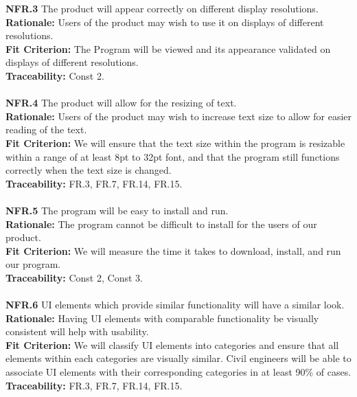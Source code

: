 \documentclass[12pt]{article}
\begin{document}
  \noindent\textbf{NFR.3} The product will appear correctly on different display resolutions.\\
  \textbf{Rationale:} Users of the product may wish to use it on displays of different resolutions.\\
  \textbf{Fit Criterion:} The Program will be viewed and its appearance validated on displays of different resolutions.\\
  \textbf{Traceability:} Const 2.\\\\

  \noindent\textbf{NFR.4} The product will allow for the resizing of text.\\
  \textbf{Rationale:} Users of the product may wish to increase text size to allow for easier reading of the text.\\
  \textbf{Fit Criterion:} We will ensure that the text size within the program is resizable within a range of at least 8pt to 32pt font, and that the program still functions correctly when the text size is changed.\\
  \textbf{Traceability:} FR.3, FR.7, FR.14, FR.15.\\\\

  \noindent\textbf{NFR.5} The program will be easy to install and run.\\
  \textbf{Rationale:} The program cannot be difficult to install for the users of our product.\\
  \textbf{Fit Criterion:} We will measure the time it takes to download, install, and run our program.\\
  \textbf{Traceability:} Const 2, Const 3.\\\\

  \noindent\textbf{NFR.6} UI elements which provide similar functionality will have a similar look.\\
  \textbf{Rationale:} Having UI elements with comparable functionality be visually consistent will help with usability.\\
  \textbf{Fit Criterion:} We will classify UI elements into categories and ensure that all elements within each categories are visually similar. Civil engineers will be able to associate UI elements with their corresponding categories in at least 90\% of cases.\\
  \textbf{Traceability:} FR.3, FR.7, FR.14, FR.15.\\\\
\end{document}
